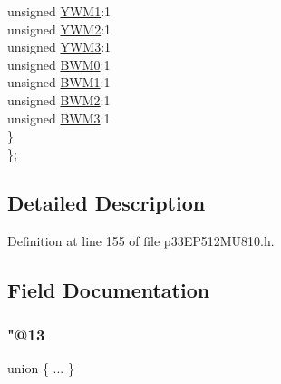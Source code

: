 \begin{DoxyCompactItemize}
\begin{tabbing}
\>\>unsigned \hyperlink{structtag_m_o_d_c_o_n_b_i_t_s_a32061a0eabe2e53a2f85a15a2decdc44}{YWM1}:1\\
\>\>unsigned \hyperlink{structtag_m_o_d_c_o_n_b_i_t_s_aa85fd7204197339c212550ad20cf18a9}{YWM2}:1\\
\>\>unsigned \hyperlink{structtag_m_o_d_c_o_n_b_i_t_s_a496663bd9b54082d576633589dd75bf5}{YWM3}:1\\
\>\>unsigned \hyperlink{structtag_m_o_d_c_o_n_b_i_t_s_acf51bba105d8b96e250f587760dc4782}{BWM0}:1\\
\>\>unsigned \hyperlink{structtag_m_o_d_c_o_n_b_i_t_s_a08295261d81142db52b1e9802e3654ed}{BWM1}:1\\
\>\>unsigned \hyperlink{structtag_m_o_d_c_o_n_b_i_t_s_a9fd446c4c4ebef5fbff11cc37dda75e0}{BWM2}:1\\
\>\>unsigned \hyperlink{structtag_m_o_d_c_o_n_b_i_t_s_a49b1a59089d8b9cbcdbf0b153464d345}{BWM3}:1\\
\>\} \\
\}; \\

\end{tabbing}\end{DoxyCompactItemize}


\subsection{Detailed Description}


Definition at line 155 of file p33\+E\+P512\+M\+U810.\+h.



\subsection{Field Documentation}
\mbox{\label{structtag_m_o_d_c_o_n_b_i_t_s_a64fa39143b9ae95228edefa1d462e8d2}} 
\subsubsection{\texorpdfstring{"@13}{@13}}
{\footnotesize\ttfamily union \{ ... \} }

\mbox{\label{structtag_m_o_d_c_o_n_b_i_t_s_adf71f3d8410c1f1dbbc96680a92c49af}} 
